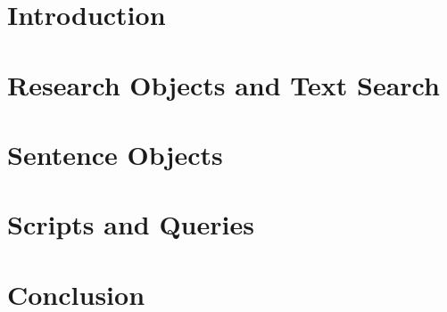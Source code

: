 \documentclass{beamer}
\begin{document}
\part{Introduction}








\part{Research Objects and Text Search}









\part{Sentence Objects}























\part{Scripts and Queries}














\part{Conclusion}






\end{document}
